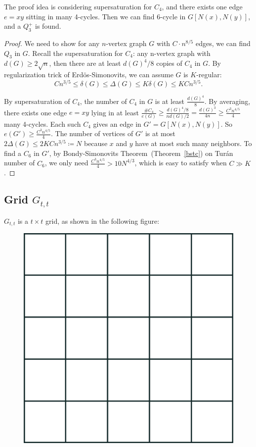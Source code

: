 \documentclass{article}
\theoremstyle{definition}
\def\Turan{Tur\'an}
\begin{document}
The proof idea is considering supersaturation for $C_{4}$, and there exists one edge $e=xy$ sitting in many 4-cycles. Then we can find 6-cycle in $G[N(x),N(y)]$, and a $Q_{3}^{+}$ is found.

\begin{proof}
    We need to show for any $n$-vertex graph $G$ with $C\cdot n^{8/5}$ edges, we can find $Q_{3}$ in $G$. Recall the supersaturation for $C_{4}$: any n-vertex graph with $d(G)\geq 2\sqrt{n}$, then there are at least $d(G)^{4}/8$ copies of $C_{4}$ in $G$. By regularization trick of Erd\"os-Simonovits, we can assume $G$ is $K$-regular:
    $$Cn^{3/5}\leq \delta(G)\leq \Delta(G)\leq K\delta(G)\leq KCn^{3/5}.$$

    By supersaturation of $C_{4}$, the number of $C_{4}$ in $G$ is at least $\frac{d(G)^{4}}{8}$. By averaging, there exists one edge $e=xy$ lying in at least $\frac{\# C_{4}}{e(G)}\geq \frac{d(G)^{4}/8}{nd(G)/2}=\frac{d(G)^{3}}{4n}\geq \frac{C^{3}n^{4/5}}{4}$ many 4-cycles. Each such $C_{4}$ gives an edge in $G'=G[N(x),N(y)]$. So $e(G')\geq \frac{C^{3}n^{4/5}}{4}$. The number of vertices of $G'$ is at most $2\Delta(G)\leq 2KCn^{3/5}\coloneqq N$ because $x$ and $y$ have at most such many neighbors. To find a $C_{6}$ in $G'$, by Bondy-Simonovits Theorem~\cite{bondy1974cycles}(Theorem~\ref{bstc}) on \Turan{} number of $C_{6}$, we only need $\frac{C^{3}n^{4/5}}{4}>10N^{4/3}$, which is easy to satisfy when $C\gg K$.
\end{proof}

\subsection{Grid $G_{t,t}$}

$G_{t,t}$ is a $t\times t$ grid, as shown in the following figure:

\begin{figure}[H]
     \centering
     \includegraphics[scale=0.05]{11-2.png}
\end{figure}
\end{document}
